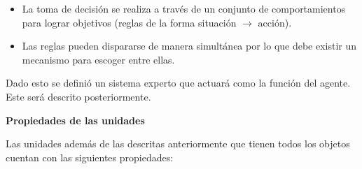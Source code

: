 \begin{itemize}
	\item La toma de decisión se realiza a través de un conjunto de comportamientos para lograr objetivos (reglas de la forma situación $\rightarrow$ acción).
	\item Las reglas pueden dispararse de manera simultánea por lo que debe existir un mecanismo para escoger entre ellas.	
\end{itemize}

Dado esto se definió un sistema experto que actuará como la función del agente. Este será descrito posteriormente.

\textbf{Propiedades de las unidades}

Las unidades además de las descritas anteriormente que tienen todos los objetos cuentan con las siguientes propiedades:

